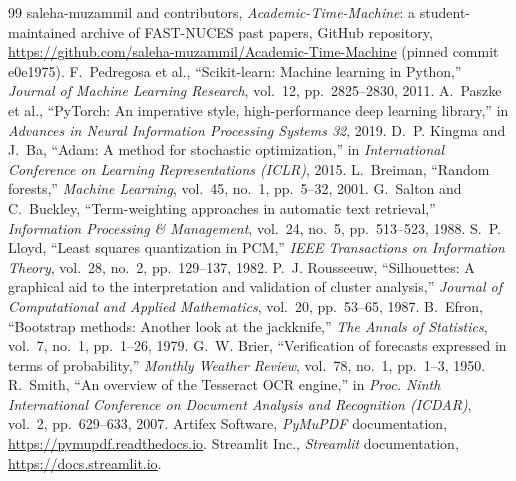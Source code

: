 \documentclass[11pt,a4paper]{article}
\begin{document}
\begin{thebibliography}{99}\small
{} saleha-muzammil and contributors, \emph{Academic-Time-Machine}: a student-maintained archive of FAST-NUCES past papers, GitHub repository, \url{https://github.com/saleha-muzammil/Academic-Time-Machine} (pinned commit e0e1975).
 F.~Pedregosa et al., ``Scikit-learn: Machine learning in Python,'' \emph{Journal of Machine Learning Research}, vol.~12, pp.~2825--2830, 2011.
 A.~Paszke et al., ``PyTorch: An imperative style, high-performance deep learning library,'' in \emph{Advances in Neural Information Processing Systems 32}, 2019.
 D.~P. Kingma and J.~Ba, ``Adam: A method for stochastic optimization,'' in \emph{International Conference on Learning Representations (ICLR)}, 2015.
 L.~Breiman, ``Random forests,'' \emph{Machine Learning}, vol.~45, no.~1, pp.~5--32, 2001.
 G.~Salton and C.~Buckley, ``Term-weighting approaches in automatic text retrieval,'' \emph{Information Processing \& Management}, vol.~24, no.~5, pp.~513--523, 1988.
 S.~P. Lloyd, ``Least squares quantization in PCM,'' \emph{IEEE Transactions on Information Theory}, vol.~28, no.~2, pp.~129--137, 1982.
 P.~J. Rousseeuw, ``Silhouettes: A graphical aid to the interpretation and validation of cluster analysis,'' \emph{Journal of Computational and Applied Mathematics}, vol.~20, pp.~53--65, 1987.
 B.~Efron, ``Bootstrap methods: Another look at the jackknife,'' \emph{The Annals of Statistics}, vol.~7, no.~1, pp.~1--26, 1979.
 G.~W. Brier, ``Verification of forecasts expressed in terms of probability,'' \emph{Monthly Weather Review}, vol.~78, no.~1, pp.~1--3, 1950.
 R.~Smith, ``An overview of the Tesseract OCR engine,'' in \emph{Proc. Ninth International Conference on Document Analysis and Recognition (ICDAR)}, vol.~2, pp.~629--633, 2007.
 Artifex Software, \emph{PyMuPDF} documentation, \url{https://pymupdf.readthedocs.io}.
 Streamlit Inc., \emph{Streamlit} documentation, \url{https://docs.streamlit.io}.
\end{thebibliography}
\end{document}
